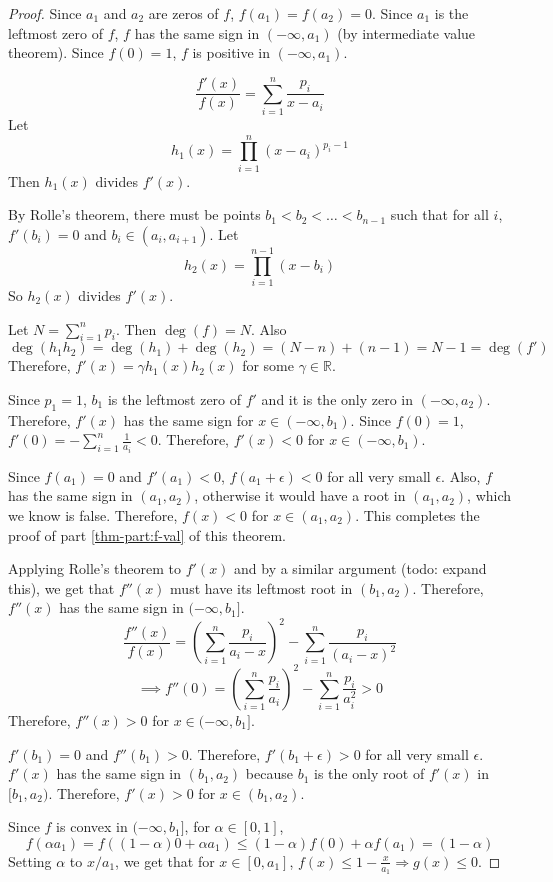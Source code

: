 \begin{proof}
Since $a_1$ and $a_2$ are zeros of $f$, $f(a_1) = f(a_2) = 0$.
Since $a_1$ is the leftmost zero of $f$,
$f$ has the same sign in $(-\infty, a_1)$ (by intermediate value theorem).
Since $f(0) = 1$, $f$ is positive in $(-\infty, a_1)$.

\[ \frac{f'(x)}{f(x)} = \sum_{i=1}^n \frac{p_i}{x - a_i} \]
Let
\[ h_1(x) = \prod_{i=1}^n (x - a_i)^{p_i - 1} \]
Then $h_1(x)$ divides $f'(x)$.

By Rolle's theorem, there must be points $b_1 < b_2 < \ldots < b_{n-1}$
such that for all $i$, $f'(b_i) = 0$ and $b_i \in (a_i, a_{i+1})$. Let
\[ h_2(x) = \prod_{i=1}^{n-1} (x - b_i) \]
So $h_2(x)$ divides $f'(x)$.

Let $N = \sum_{i=1}^n p_i$. Then $\deg(f) = N$. Also
\[ \deg(h_1 h_2) = \deg(h_1) + \deg(h_2) = (N-n) + (n-1) = N-1 = \deg(f') \]
Therefore, $f'(x) = \gamma h_1(x) h_2(x)$ for some $\gamma \in \mathbb{R}$.

Since $p_1 = 1$, $b_1$ is the leftmost zero of $f'$
and it is the only zero in $(-\infty, a_2)$.
Therefore, $f'(x)$ has the same sign for $x \in (-\infty, b_1)$.
Since $f(0) = 1$, $f'(0) = - \sum_{i=1}^n \frac{1}{a_i} < 0$.
Therefore, $f'(x) < 0$ for $x \in (-\infty, b_1)$.

Since $f(a_1) = 0$ and $f'(a_1) < 0$, $f(a_1 + \epsilon) < 0$ for all very small $\epsilon$.
Also, $f$ has the same sign in $(a_1, a_2)$, otherwise
it would have a root in $(a_1, a_2)$, which we know is false.
Therefore, $f(x) < 0$ for $x \in (a_1, a_2)$.
This completes the proof of part \ref{thm-part:f-val} of this theorem.

Applying Rolle's theorem to $f'(x)$ and by a similar argument (todo: expand this),
we get that $f''(x)$ must have its leftmost root in $(b_1, a_2)$.
Therefore, $f''(x)$ has the same sign in $(-\infty, b_1]$.
\[ \frac{f''(x)}{f(x)} = \left(\sum_{i=1}^n \frac{p_i}{a_i - x}\right)^2
    - \sum_{i=1}^n \frac{p_i}{(a_i - x)^2} \]
\[ \implies f''(0) = \left(\sum_{i=1}^n \frac{p_i}{a_i} \right)^2 - \sum_{i=1}^n \frac{p_i}{a_i^2} > 0 \]
Therefore, $f''(x) > 0$ for $x \in (-\infty, b_1]$.

$f'(b_1) = 0$ and $f''(b_1) > 0$.
Therefore, $f'(b_1 + \epsilon) > 0$ for all very small $\epsilon$.
$f'(x)$ has the same sign in $(b_1, a_2)$ because $b_1$ is the only root of $f'(x)$ in $[b_1, a_2)$.
Therefore, $f'(x) > 0$ for $x \in (b_1, a_2)$.

Since $f$ is convex in $(-\infty, b_1]$, for $\alpha \in [0, 1]$,
\[ f(\alpha a_1) = f((1-\alpha)0 + \alpha a_1)
\le (1-\alpha)f(0) + \alpha f(a_1) = (1-\alpha) \]
Setting $\alpha$ to $x / a_1$, we get that for $x \in [0, a_1]$,
$f(x) \le 1 - \frac{x}{a_1} \Rightarrow g(x) \le 0$.


\end{proof}
